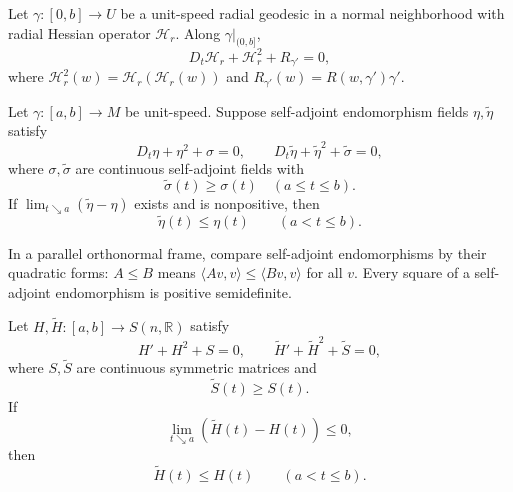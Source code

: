 \begin{theorem}
\label{thm:riccati-equation}
Let $\gamma:[0,b]\to U$ be a unit-speed radial geodesic in a normal
neighborhood with radial Hessian operator $\mathcal H_r$.  Along
$\gamma|_{(0,b]}$,
\begin{equation}
D_t\mathcal H_r+\mathcal H_r^2+R_{\gamma'}=0, \tag{11.7}
\end{equation}
where $\mathcal H_r^2(w)=\mathcal H_r(\mathcal H_r(w))$ and
$R_{\gamma'}(w)=R(w,\gamma')\gamma'$.
\end{theorem}

\begin{theorem}
\label{thm:riccati-comparison-theorem}
Let $\gamma:[a,b]\to M$ be unit-speed.  Suppose self-adjoint endomorphism
fields $\eta,\widetilde\eta$ satisfy
\begin{equation}
D_t\eta+\eta^2+\sigma=0,
\qquad
D_t\widetilde\eta+\widetilde\eta^2+\widetilde\sigma=0, \tag{11.8}
\end{equation}
where $\sigma,\widetilde\sigma$ are continuous self-adjoint fields with
\begin{equation}
\widetilde\sigma(t)\geq\sigma(t)\quad(a\leq t\leq b). \tag{11.9}
\end{equation}
If $\lim_{t\searrow a}(\widetilde\eta-\eta)$ exists and is nonpositive, then
\[
\widetilde\eta(t)\leq\eta(t)\qquad(a<t\leq b).
\]
\end{theorem}

In a parallel orthonormal frame, compare self-adjoint endomorphisms by their
quadratic forms: $A\leq B$ means
$\langle Av,v\rangle\leq\langle Bv,v\rangle$ for all $v$.  Every square of a
self-adjoint endomorphism is positive semidefinite.

\begin{theorem}
\label{thm:matrix-riccati-comparison}
Let $H,\widetilde H:[a,b]\to S(n,\mathbb R)$ satisfy
\begin{equation}
H'+H^2+S=0,
\qquad
\widetilde H'+\widetilde H^2+\widetilde S=0, \tag{11.10}
\end{equation}
where $S,\widetilde S$ are continuous symmetric matrices and
\begin{equation}
\widetilde S(t)\geq S(t). \tag{11.11}
\end{equation}
If
\begin{equation}
\lim_{t\searrow a}(\widetilde H(t)-H(t))\leq0, \tag{11.12}
\end{equation}
then
\begin{equation}
\widetilde H(t)\leq H(t)\qquad(a<t\leq b). \tag{11.13}
\end{equation}
\end{theorem}

